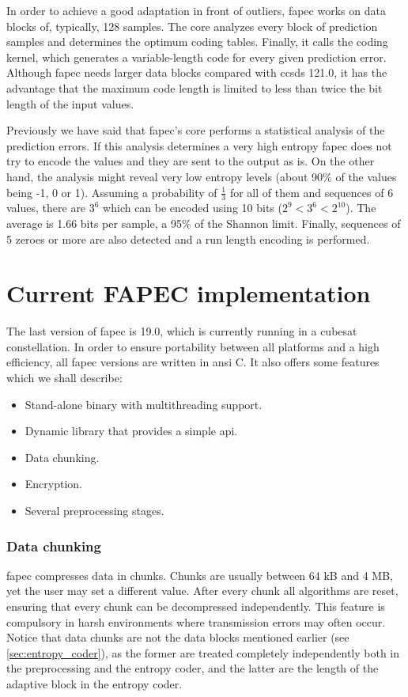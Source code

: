 In order to achieve a good adaptation in front of outliers, \acrshort{fapec} works on data blocks of, typically, 128 samples. The core analyzes every block of prediction samples and determines the optimum coding tables. Finally, it calls the coding kernel, which generates a variable-length code for every given prediction error. Although \acrshort{fapec} needs larger data blocks compared with \acrshort{ccsds} 121.0, it has the advantage that the maximum code length is limited to less than twice the bit length of the input values.

Previously we have said that \acrshort{fapec}'s core performs a statistical analysis of the prediction errors. If this analysis determines a very high entropy \acrshort{fapec} does not try to encode the values and they are sent to the output as is. On the other hand, the analysis might reveal very low entropy levels (about 90\% of the values being -1, 0 or 1). Assuming a probability of $\frac{1}{3}$ for all of them and sequences of 6 values, there are $3^6$ which can be encoded using 10 bits ($2^9 < 3^6 < 2^{10}$). The average is 1.66 bits per sample, a 95\% of the Shannon limit. Finally, sequences of 5 zeroes or more are also detected and a run length encoding is performed.

\section{Current FAPEC implementation}
The last version of \acrshort{fapec} is 19.0, which is currently running in a cubesat constellation. In order to ensure portability between all platforms and a high efficiency, all \acrshort{fapec} versions are written in \acrshort{ansi} C. It also offers some features which we shall describe:

\begin{itemize}
	\item Stand-alone binary with multithreading support.
	\item Dynamic library that provides a simple \acrshort{api}.
	\item Data chunking.
	\item Encryption.
	\item Several preprocessing stages.
\end{itemize}

\subsubsection{Data chunking}
\acrshort{fapec} compresses data in chunks. Chunks are usually between 64 kB and 4 MB, yet the user may set a different value. After every chunk all algorithms are reset, ensuring that every chunk can be decompressed independently. This feature is compulsory in harsh environments where transmission errors may often occur. Notice that data chunks are not the data blocks mentioned earlier (see \ref{sec:entropy_coder}), as the former are treated completely independently both in the preprocessing and the entropy coder, and the latter are the length of the adaptive block in the entropy coder.

